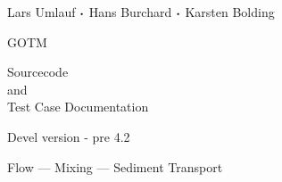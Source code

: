 \documentclass[a4paper,twoside]{article}
\begin{document}
\begin{titlepage}


{\sf \bf \LARGE
 \begin{center}
   Lars Umlauf ${\boldsymbol \cdot}$ Hans Burchard ${\boldsymbol \cdot}$ Karsten Bolding
 \end{center}
}

\vspace{14mm}

{\sf \bf \Huge
 \begin{center}
   GOTM
 \end{center}
}

\vspace{6mm}

{\sf \bf \LARGE
 \begin{center}
   Sourcecode \\
      and \\
Test Case Documentation
 \end{center}
}


\vspace{5mm}

{\sf \bf \Large
 \begin{center}
  Devel version - pre 4.2
 \end{center}
}

\vspace{8mm}

\begin{figure}[!h]
  \begin{center}
  \end{center}
\end{figure}

\vspace{7mm}

{\sf \bf \Large
 \begin{center}
  Flow ---  Mixing --- Sediment Transport
\end{center}
}


\end{titlepage}


\tableofcontents









\end{document}
